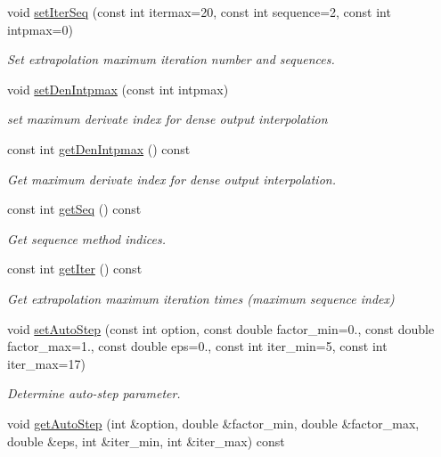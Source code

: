 \begin{DoxyCompactItemize}
void \hyperlink{classARC_1_1chainpars_a58bf0df2cd23671e3e4651e9fe87ddae}{set\+Iter\+Seq} (const int itermax=20, const int sequence=2, const int intpmax=0)
\begin{DoxyCompactList}\small\item\em Set extrapolation maximum iteration number and sequences. \end{DoxyCompactList}\item 
void \hyperlink{classARC_1_1chainpars_a53ef5c1f0077aee49c110982f69ced9c}{set\+Den\+Intpmax} (const int intpmax)
\begin{DoxyCompactList}\small\item\em set maximum derivate index for dense output interpolation \end{DoxyCompactList}\item 
const int \hyperlink{classARC_1_1chainpars_a394aa470175760d3e1f518b68067c9dc}{get\+Den\+Intpmax} () const
\begin{DoxyCompactList}\small\item\em Get maximum derivate index for dense output interpolation. \end{DoxyCompactList}\item 
const int \hyperlink{classARC_1_1chainpars_aea815f20c4efe8e93d68153e41275770}{get\+Seq} () const
\begin{DoxyCompactList}\small\item\em Get sequence method indices. \end{DoxyCompactList}\item 
const int \hyperlink{classARC_1_1chainpars_a000356820943c99de5542b04130f453f}{get\+Iter} () const
\begin{DoxyCompactList}\small\item\em Get extrapolation maximum iteration times (maximum sequence index) \end{DoxyCompactList}\item 
void \hyperlink{classARC_1_1chainpars_a049e663206a8fba9bc0abc7a0be805eb}{set\+Auto\+Step} (const int option, const double factor\+\_\+min=0., const double factor\+\_\+max=1., const double eps=0., const int iter\+\_\+min=5, const int iter\+\_\+max=17)
\begin{DoxyCompactList}\small\item\em Determine auto-\/step parameter. \end{DoxyCompactList}\item 
void \hyperlink{classARC_1_1chainpars_a9758b3d019bd02f2fd27614c99d7fc84}{get\+Auto\+Step} (int \&option, double \&factor\+\_\+min, double \&factor\+\_\+max, double \&eps, int \&iter\+\_\+min, int \&iter\+\_\+max) const

\end{DoxyCompactItemize}

